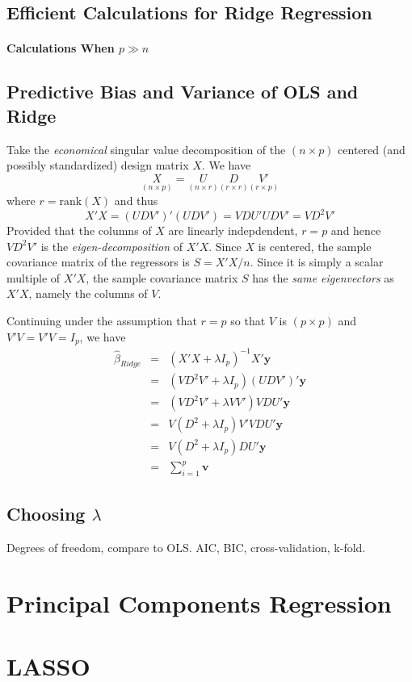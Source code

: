 \documentclass[12pt]{article}
\theoremstyle{definition}
\begin{document}
\subsection{Efficient Calculations for Ridge Regression}

\paragraph{Calculations When $p\gg n$} 


\subsection{Predictive Bias and Variance of OLS and Ridge}

Take the \emph{economical} singular value decomposition of the $(n\times p)$ centered (and possibly standardized) design matrix $X$. We have
	$$\underset{(n\times p)}{X} = \underset{(n\times r)}{U} \underset{(r\times r)}{D} \underset{(r\times p)}{V'}$$
where $r = \mbox{rank}(X)$ and thus
	$$X'X = (UDV')'(UDV') = VDU'UDV' = VD^2V'$$
Provided that the columns of $X$ are linearly indepdendent, $r = p$ and hence $VD^2 V'$ is the \emph{eigen-decomposition} of $X'X$. Since $X$ is centered, the sample covariance matrix of the regressors is $S = X'X/n$. Since it is simply a scalar multiple of $X'X$, the sample covariance matrix $S$ has the \emph{same eigenvectors} as $X'X$, namely the columns of $V$.


Continuing under the assumption that $r = p$ so that $V$ is $(p\times p)$ and $V'V = V'V = I_p$, we have
	\begin{eqnarray*}
		\widehat{\beta}_{Ridge} &=& \left(X'X  +\lambda I_p\right)^{-1} X'\mathbf{y} \\
		&=& \left(VD^2V' + \lambda I_p\right)(UDV')' \mathbf{y}\\
		&=& \left(VD^2V' + \lambda VV'\right)VDU' \mathbf{y}\\
		&=& V(D^2 + \lambda I_p)V'VDU'\mathbf{y}\\
		&=&V(D^2 + \lambda I_p)DU' \mathbf{y}\\
		&=& \sum_{i=1}^p \mathbf{v}
	\end{eqnarray*}

\subsection{Choosing $\lambda$}
Degrees of freedom, compare to OLS. AIC, BIC, cross-validation, k-fold.

\section{Principal Components Regression}

\section{LASSO}
\end{document}
